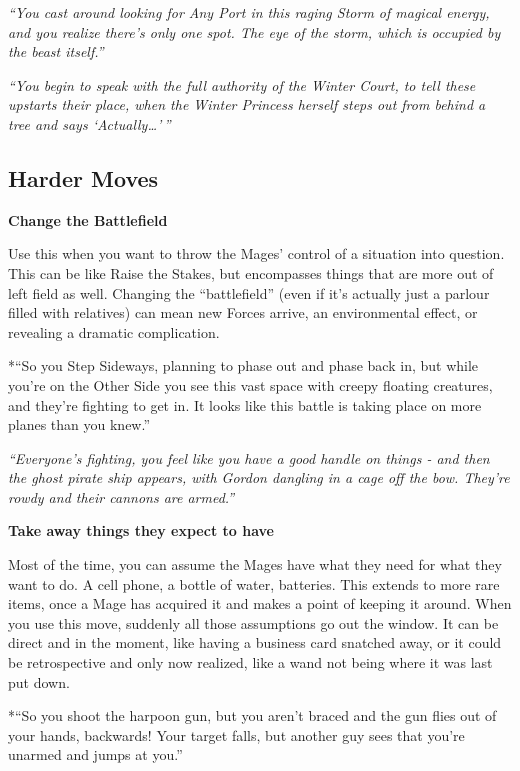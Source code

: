 \documentclass[
  oneside,
  statementpaper,
  9pt]{memoir}
\begin{document}
\emph{``You cast around looking for Any Port in this raging Storm of
magical energy, and you realize there's only one spot. The eye of the
storm, which is occupied by the beast itself.''}

\emph{``You begin to speak with the full authority of the Winter Court,
to tell these upstarts their place, when the Winter Princess herself
steps out from behind a tree and says `Actually\ldots{}'\,''}

\hypertarget{harder-moves}{%
\subsection{Harder Moves}\label{harder-moves}}

\textbf{Change the Battlefield}

Use this when you want to throw the Mages' control of a situation into
question. This can be like Raise the Stakes, but encompasses things that
are more out of left field as well. Changing the ``battlefield'' (even
if it's actually just a parlour filled with relatives) can mean new
Forces arrive, an environmental effect, or revealing a dramatic
complication.

*``So you Step Sideways, planning to phase out and phase back in, but
while you're on the Other Side you see this vast space with creepy
floating creatures, and they're fighting to get in. It looks like this
battle is taking place on more planes than you knew.''

\emph{``Everyone's fighting, you feel like you have a good handle on
things - and then the ghost pirate ship appears, with Gordon dangling in
a cage off the bow. They're rowdy and their cannons are armed.''}

\textbf{Take away things they expect to have}

Most of the time, you can assume the Mages have what they need for what
they want to do. A cell phone, a bottle of water, batteries. This
extends to more rare items, once a Mage has acquired it and makes a
point of keeping it around. When you use this move, suddenly all those
assumptions go out the window. It can be direct and in the moment, like
having a business card snatched away, or it could be retrospective and
only now realized, like a wand not being where it was last put down.

*``So you shoot the harpoon gun, but you aren't braced and the gun flies
out of your hands, backwards! Your target falls, but another guy sees
that you're unarmed and jumps at you.''
\end{document}
